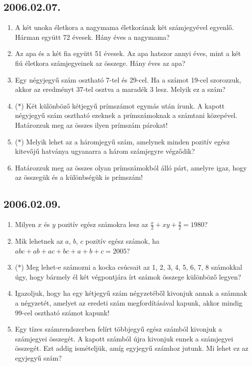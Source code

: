 \documentclass{article}
\begin{document}
\subsection*{2006.02.07.}
\begin{enumerate}
\item A két unoka életkora a nagymama életkorának két számjegyével egyenlő. Hárman együtt 72 évesek. Hány éves a nagymama?
\item Az apa és a két fia együtt 51 évesek. Az apa hatszor annyi éves, mint a két fiú életkora számjegyeinek az összege. Hány éves az apa?
\item Egy négyjegyű szám osztható 7-tel és 29-cel.
Ha a számot 19-cel szorozzuk, akkor az eredményt 37-tel osztva a maradék 3 lesz. Melyik ez a szám?
\item ($*$) Két különböző kétjegyű prímszámot egymás után írunk. A kapott négyjegyű szám osztható ezeknek a prímszámoknak a számtani közepével. Határozzuk meg az összes ilyen prímszám párokat!
\item ($*$) Melyik lehet az a háromjegyű szám, amelynek minden pozitív egész kitevőjű hatványa ugyanarra a három számjegyre végződik?
\item Határozzuk meg az összes olyan prímszámokból álló párt, amelyre igaz, hogy az összegük és a különbségük is prímszám!
\end{enumerate}

\subsection*{2006.02.09.}
\begin{enumerate}
\item Milyen $x$ és $y$ pozitív egész számokra lesz az $\frac{x}{2}+xy+\frac{y}{2}=1980$?

\item Mik lehetnek az $a$, $b$, $c$ pozitív egész számok, ha $abc+ab+ac+bc+a+b+c=2005$?

\item ($*$) Meg lehet-e számozni a kocka csúcsait az 1, 2, 3, 4, 5, 6, 7, 8 számokkal úgy, hogy bármely él két végpontjára írt számok összege különböző legyen?

\item Igazoljuk, hogy ha egy kétjegyű szám négyzetéből kivonjuk annak a számnak a négyzetét, amelyet az eredeti szám megfordításával kapunk, akkor mindig 99-cel osztható számot kapunk!

\item Egy tízes számrendszerben felírt többjegyű egész számból kivonjuk a számjegyei összegét. A kapott számból újra kivonjuk ennek a számjegyei összegét. Ezt addig ismételjük, amíg egyjegyű számhoz jutunk. Mi lehet ez az egyjegyű szám?

 
\end{enumerate}
\end{document}
